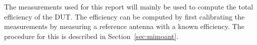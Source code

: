 The measurements used for this report will mainly be used to compute the total efficiency of the DUT.
The efficiency can be computed by first calibrating the measurements by measuring a reference antenna with a known efficiency. The procedure for this is described in Section~\ref{sec:mimoant}.

